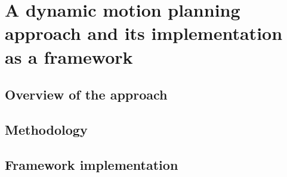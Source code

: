 \chapter{A dynamic motion planning approach and its implementation as a framework}
\section{Overview of the approach}
\section{Methodology}
\section{Framework implementation}
